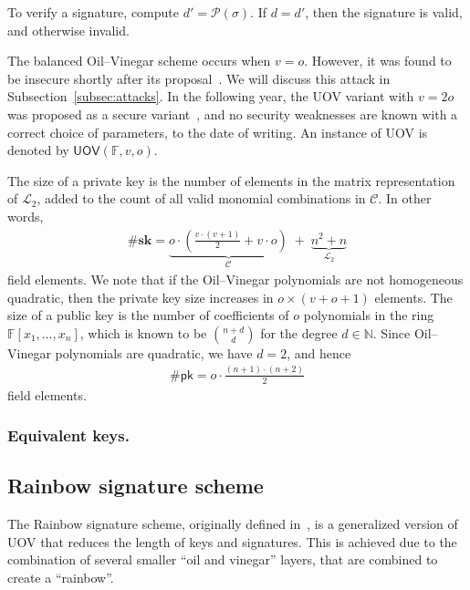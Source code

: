 \documentclass[draft, 12pt, a4paper, oneside]{memoir}
\theoremstyle{definition}
\begin{document}
To verify a signature, compute $d' = \mathcal{P}(\sigma)$. If $d = d'$, then the signature is valid, and otherwise invalid.

The balanced Oil--Vinegar scheme occurs when $v = o$. However, it was found to be insecure shortly after its proposal~\cite{Kipnis:199808}. We will discuss this attack in Subsection~\ref{subsec:attacks}. In the following year, the UOV variant with $v = 2o$ was proposed as a secure variant~\cite{Kipnis:199904}, and no security weaknesses are known with a correct choice of parameters, to the date of writing. An instance of UOV is denoted by $\mathsf{UOV}(\mathbb{F},v, o)$. 

The size of a private key is the number of elements in the matrix representation of $\mathcal{L}_{2}$, added to the count of all valid monomial combinations in $\mathcal{C}$. In other words,
\begin{align}
  \#\mathbf{sk} = \underbrace{o \cdot \left( \frac{v \cdot (v + 1)}{2} + v \cdot o \right)}_{\mathcal{C}} \;
    + \; \underbrace{n^{2} + n}_{\mathcal{L}_{2}}
\end{align}
field elements. We note that if the Oil--Vinegar polynomials are not homogeneous quadratic, then the private key size increases in $o \times (v + o + 1)$ elements. The size of a public key is the number of coefficients of $o$ polynomials in the ring $\mathbb{F}[x_{1}, \dots, x_{n}]$, which is known to be $\binom{n + d}{d}$ for the degree $d \in \mathbb{N}$. Since Oil--Vinegar polynomials are quadratic, we have $d = 2$, and hence
\begin{align}
  \#\mathsf{pk} = o \cdot \frac{(n + 1) \cdot (n + 2)}{2}
\end{align}
field elements.

\subsubsection{Equivalent keys.}


\subsection{Rainbow signature scheme}\label{subsec:rainbow}

The Rainbow signature scheme, originally defined in~\cite{Ding:200506}, is a generalized version of UOV that reduces the length of keys and signatures. This is achieved due to the combination of several smaller ``oil and vinegar'' layers, that are combined to create a ``rainbow''.
\end{document}
